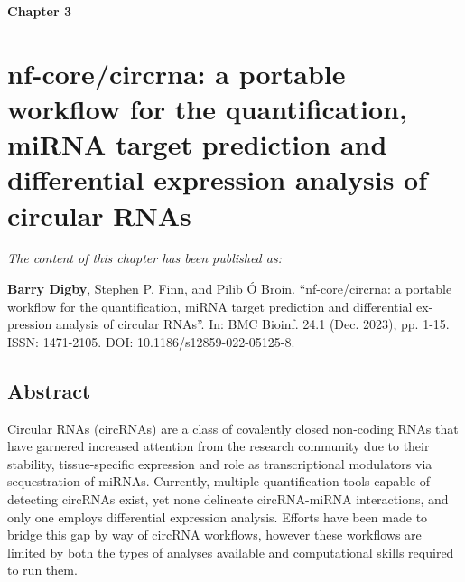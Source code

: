 {\Huge \bfseries \noindent Chapter 3}
\vspace{-1em} 
\section*{\LARGE nf-core/circrna: a portable workflow for the quantification, miRNA target prediction and differential expression analysis of circular RNAs}
\setcounter{section}{3}
\setcounter{subsection}{0}  %
\renewcommand{\chapternum}{3}

\renewcommand{\thefigure}{\chapternum.\arabic{figure}}
\setcounter{figure}{0}
\renewcommand{\thetable}{\chapternum.\arabic{table}}
\setcounter{table}{0}


\begin{center}
    \textit{The content of this chapter has been published as:} \par
    \vspace{0.55cm}
    \textbf{Barry Digby}, Stephen P. Finn, and Pilib Ó Broin. “nf-core/circrna: a portable
workflow for the quantification, miRNA target prediction and differential ex-
pression analysis of circular RNAs”. In: BMC Bioinf. 24.1 (Dec. 2023), pp. 1-15.
ISSN: 1471-2105. DOI: 10.1186/s12859-022-05125-8.
\end{center}

\subsection*{Abstract}

Circular RNAs (circRNAs) are a class of covalently closed non-coding RNAs that have garnered increased attention from the research community due to their stability, tissue-specific expression and role as transcriptional modulators via sequestration of miRNAs. Currently, multiple quantification tools capable of detecting circRNAs exist, yet none delineate circRNA-miRNA interactions, and only one employs differential expression analysis. Efforts have been made to bridge this gap by way of circRNA workflows, however these workflows are limited by both the types of analyses available and computational skills required to run them.



